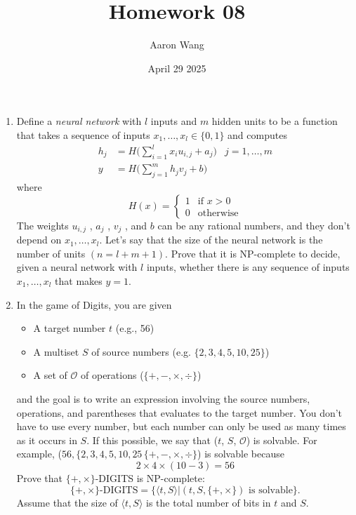\documentclass{article}
\title{Homework 08}
\author{Aaron Wang}
\date{April 29 2025}
\newcommand{\newp}{\\[2mm]}
\begin{document}
\maketitle
\begin{enumerate}
    \item Define a \emph{neural network} with $l$ inputs and $m$ hidden units to be a function that takes a sequence of inputs  $x_1, \ldots, x_l \in \{0, 1\}$ and computes
    \begin{align*}
        \displaystyle
        h_j &= H\Big(\sum_{i=1}^lx_iu_{i,j}+a_j\Big) & j = 1,\ldots,m\\
        y &= H\Big(\sum_{j=1}^mh_jv_j+b\Big)
    \end{align*}
    where
    \[
        H(x) = 
        \begin{cases}
            1 & \text{if } x > 0\\
            0 & \text{otherwise}
        \end{cases}
    \]
    The weights $u_{i,j}$ , $a_j$ , $v_j$ , and $b$ can be any rational numbers, and they don’t depend on $x_1, \ldots, x_l$. Let’s say that the size of the neural network is the number of units $(n = l + m + 1)$.
    Prove that it is NP-complete to decide, given a neural network with $l$ inputs, whether there is any sequence of inputs $x_1, \ldots, x_l$ that makes $y = 1$.\newp
    
\newpage
    \item In the game of Digits, you are given
    \begin{itemize}
        \item A target number $t$ (e.g., 56)
        \item A multiset $S$ of source numbers (e.g. $\{2, 3, 4, 5, 10, 25\}$)
        \item A set of $\mathcal{O}$ of operations ($\{+,-,\times,\div\}$)
    \end{itemize}
    and the goal is to write an expression involving the source numbers, operations, and parentheses that evaluates to the target number. You don’t have to use every number, but each number can only be used as many times as it occurs in $S$. If this possible, we say that ($t$, $S$, $\mathcal{O}$) is solvable. For example, ($56, \{2, 3, 4, 5, 10, 25\, \{+, -, \times, \div \}$) is solvable because
    \[
    2 \times 4 \times (10 - 3) = 56
    \]
    Prove that $\{+, \times \}$-DIGITS is NP-complete:
    \[
        \{+, \times \}\text{-DIGITS} = \{\langle t, S \rangle | (t, S, \{+, \times \}) \text{ is solvable} \}.
    \]
    Assume that the size of $\langle t, S\rangle$ is the total number of bits in $t$ and $S$.\newp

\end{enumerate}
\end{document}
